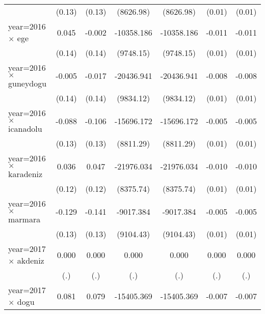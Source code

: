 {\begin{tabular}{l*{6}{c}}
                    &      (0.13)         &      (0.13)         &   (8626.98)         &   (8626.98)         &      (0.01)         &      (0.01)         \\
year=2016 $\times$ ege&       0.045         &      -0.002         &  -10358.186         &  -10358.186         &      -0.011         &      -0.011         \\
                    &      (0.14)         &      (0.14)         &   (9748.15)         &   (9748.15)         &      (0.01)         &      (0.01)         \\
year=2016 $\times$ guneydogu&      -0.005         &      -0.017         &  -20436.941\sym{*}  &  -20436.941\sym{*}  &      -0.008         &      -0.008         \\
                    &      (0.14)         &      (0.14)         &   (9834.12)         &   (9834.12)         &      (0.01)         &      (0.01)         \\
year=2016 $\times$ icanadolu&      -0.088         &      -0.106         &  -15696.172         &  -15696.172         &      -0.005         &      -0.005         \\
                    &      (0.13)         &      (0.13)         &   (8811.29)         &   (8811.29)         &      (0.01)         &      (0.01)         \\
year=2016 $\times$ karadeniz&       0.036         &       0.047         &  -21976.034\sym{**} &  -21976.034\sym{**} &      -0.010         &      -0.010         \\
                    &      (0.12)         &      (0.12)         &   (8375.74)         &   (8375.74)         &      (0.01)         &      (0.01)         \\
year=2016 $\times$ marmara&      -0.129         &      -0.141         &   -9017.384         &   -9017.384         &      -0.005         &      -0.005         \\
                    &      (0.13)         &      (0.13)         &   (9104.43)         &   (9104.43)         &      (0.01)         &      (0.01)         \\
year=2017 $\times$ akdeniz&       0.000         &       0.000         &       0.000         &       0.000         &       0.000         &       0.000         \\
                    &         (.)         &         (.)         &         (.)         &         (.)         &         (.)         &         (.)         \\
year=2017 $\times$ dogu&       0.081         &       0.079         &  -15405.369         &  -15405.369         &      -0.007         &      -0.007         \\

\end{tabular}}
